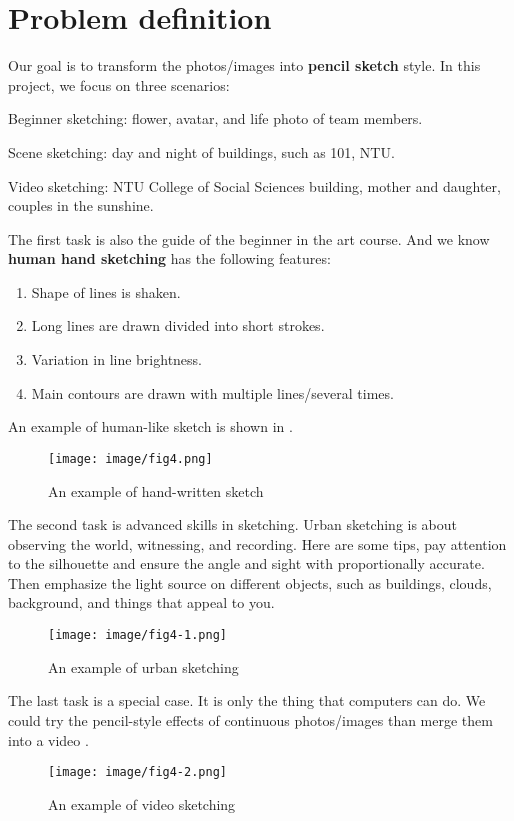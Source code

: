 \section{Problem definition}
Our goal is to transform the photos/images into \textbf{pencil sketch} style.
In this project, we focus on three scenarios:
\begin{tasks}
    \item Beginner sketching: flower, avatar, and life photo of team members.
    \item Scene sketching: day and night of buildings, such as 101, NTU.
    \item Video sketching: NTU College of Social Sciences building, mother and daughter, couples in the sunshine.
\end{tasks}
The first task is also the guide of the beginner in the art course. And we know \textbf{human hand sketching} has the following features:
\begin{enumerate}
    \item Shape of lines is shaken.
    \item Long lines are drawn divided into short strokes.
    \item Variation in line brightness.
    \item Main contours are drawn with multiple lines/several times.
\end{enumerate}
An example of human-like sketch is shown in  \cite{2017_Okawa_canny}.
\begin{figure}
    \centering
    \texttt{[image: image/fig4.png]}
    \caption{An example of hand-written sketch}
    \label{fig4}
\end{figure}

The second task is advanced skills in sketching. Urban sketching  is about observing the world, witnessing, and recording. Here are some tips, pay attention to the silhouette and ensure the angle and sight with proportionally accurate. Then emphasize the light source on different objects, such as buildings, clouds, background, and things that appeal to you.
\begin{figure}
    \centering
    \texttt{[image: image/fig4-1.png]}
    \caption{An example of urban sketching}
    \label{fig4-1}
\end{figure}

The last task is a special case. It is only the thing that computers can do. We could try the pencil-style effects of continuous photos/images than merge them into a video .
\begin{figure}
    \centering
    \texttt{[image: image/fig4-2.png]}
    \caption{An example of video sketching}
    \label{fig4-2}
\end{figure}

